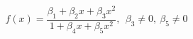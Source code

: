 

\[
f(x) = \frac{\beta_1 + \beta_2x + \beta_3x^2}{1 + \beta_4x + \beta_5x^2}, \ \ \beta_3 \neq 0, \ \beta_5 \neq 0
\]


